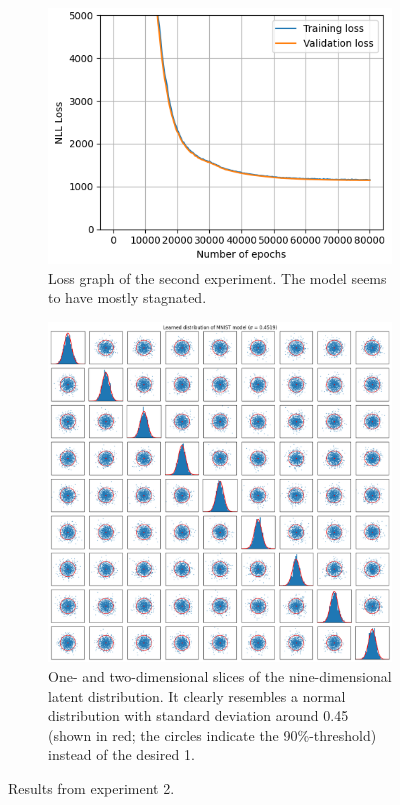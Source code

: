 \begin{figure}
\centering
\begin{subfigure}[t]{.48\textwidth}
    \centering
    \includegraphics[width=\textwidth]{images/mnist_maxpooling/run_2_loss.png}
    \caption{Loss graph of the second experiment. The model seems to have mostly stagnated.}
    \label{fig:run_2_loss}
\end{subfigure}
\hfill
\begin{subfigure}[t]{.48\textwidth}
    \centering
    \includegraphics[width=.8\textwidth]{images/mnist_maxpooling/run_2_latent_distr.png}
    \caption{One- and two-dimensional slices of the nine-dimensional latent distribution. It clearly resembles a normal distribution with standard deviation around 0.45 (shown in red; the circles indicate the 90\%-threshold) instead of the desired 1.}
    \label{fig:mnist_run_2_latent_distr}
\end{subfigure}
\caption{Results from experiment 2.}
\end{figure}

